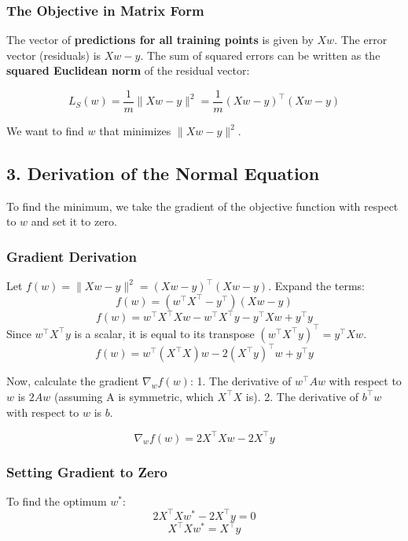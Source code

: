 \documentclass[
  italian,
  11pt,
]{article}
\begin{document}
\subsubsection{The Objective in Matrix
Form}\label{the-objective-in-matrix-form}

The vector of \textbf{predictions for all training points} is given by
\(Xw\). The error vector (residuals) is \(Xw - y\). The sum of squared
errors can be written as the \textbf{squared Euclidean norm} of the
residual vector:

\[ L_S(w) = \frac{1}{m} \| Xw - y \|^2 = \frac{1}{m} (Xw - y)^\top (Xw - y) \]

We want to find \(w\) that minimizes \(\| Xw - y \|^2\).

\subsection{3. Derivation of the Normal
Equation}\label{derivation-of-the-normal-equation}

To find the minimum, we take the gradient of the objective function with
respect to \(w\) and set it to zero.

\subsubsection{Gradient Derivation}\label{gradient-derivation}

Let \(f(w) = \| Xw - y \|^2 = (Xw - y)^\top (Xw - y)\). Expand the
terms: \[ f(w) = (w^\top X^\top - y^\top)(Xw - y) \]
\[ f(w) = w^\top X^\top X w - w^\top X^\top y - y^\top X w + y^\top y \]
Since \(w^\top X^\top y\) is a scalar, it is equal to its transpose
\((w^\top X^\top y)^\top = y^\top X w\).
\[ f(w) = w^\top (X^\top X) w - 2 (X^\top y)^\top w + y^\top y \]

Now, calculate the gradient \(\nabla_w f(w)\): 1. The derivative of
\(w^\top A w\) with respect to \(w\) is \(2Aw\) (assuming A is
symmetric, which \(X^\top X\) is). 2. The derivative of \(b^\top w\)
with respect to \(w\) is \(b\).

\[ \nabla_w f(w) = 2 X^\top X w - 2 X^\top y \]

\subsubsection{Setting Gradient to Zero}\label{setting-gradient-to-zero}

To find the optimum \(w^*\): \[ 2 X^\top X w^* - 2 X^\top y = 0 \]
\[ X^\top X w^* = X^\top y \]
\end{document}
